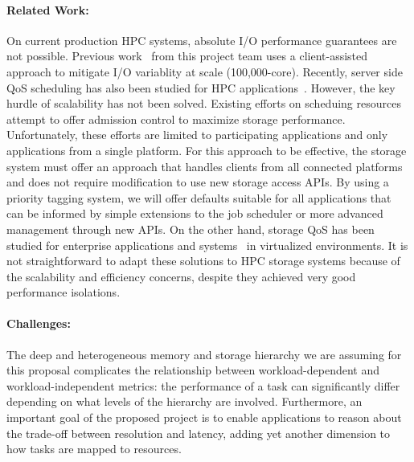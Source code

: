 \paragraph{Related Work:}
On current production HPC systems, absolute I/O performance guarantees are not
possible. Previous work~\cite{lofstead:2010:io-variability,liu_hotstorage} from
this project team uses a client-assisted approach to mitigate I/O variablity at
scale (100,000-core).  Recently, server side QoS scheduling has also been
studied for HPC applications~\cite{Dai:2014}.  However, the key hurdle of
scalability has not been solved.  Existing efforts on scheduing
resources~\cite{thapaliya:2014:io-cop,dorier:2014:calciom} attempt to offer
admission control to maximize storage performance. Unfortunately, these efforts
are limited to participating applications and only applications from a single
platform. For this approach to be effective, the storage system must offer an
approach that handles clients from all connected platforms and does not require
modification to use new storage access APIs. By using a priority tagging
system, we will offer defaults suitable for all applications that can be
informed by simple extensions to the job scheduler or more advanced management
through new APIs. On the other hand, storage QoS has been studied for
enterprise applications and systems~\cite{Gulati:2007,Gulati:2010,Gulati:2012}
in virtualized environments. It is not straightforward to adapt these solutions
to HPC storage systems because of the scalability and efficiency concerns,
despite they achieved very good performance isolations.

\paragraph{Challenges:}
The deep and heterogeneous memory and storage hierarchy we are assuming for
this proposal complicates the relationship between workload-dependent and
workload-independent metrics: the performance of a task can significantly
differ depending on what levels of the hierarchy are involved. Furthermore, an
important goal of the proposed project is to enable applications to reason
about the trade-off between resolution and latency, adding yet another
dimension to how tasks are mapped to resources.

